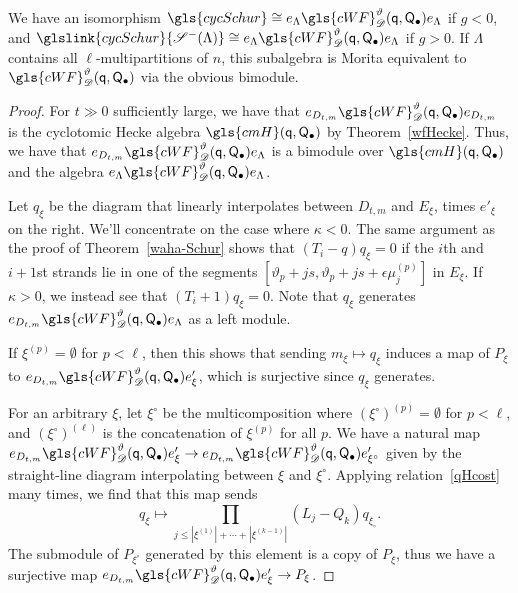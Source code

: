 \documentclass[ALCO,ThmDefs,Unicode,epreuves]{cedram}
\newcommand{\ck}{g}
\newcommand{\pq}{\mathsf{q}}
\newcommand{\PQ}{\mathsf{Q}}
\begin{document}
\begin{prop}\label{cqs-morita}
We have an isomorphism $\gls{cycSchur}\cong e_\Lambda \gls{cWF}^\vartheta_\mathscr{D}
 (\pq,\PQ_{\bullet})e_\Lambda $ if $\ck<0$, and $ \glslink{cycSchur}{\mathscr{S}^-(\Lambda)}\cong e_\Lambda \gls{cWF}^\vartheta_\mathscr{D}
 (\pq,\PQ_{\bullet})e_\Lambda $ if $\ck>0$. If $\Lambda$ contains all
 $\ell$-multipartitions of $n$, this subalgebra is Morita equivalent to $\gls{cWF}^\vartheta_\mathscr{D}
 (\pq,\PQ_{\bullet})$ via the obvious bimodule.
\end{prop}
\begin{proof}
 For $t\gg 0$ sufficiently large, we have that $e_{D_{t,m}}\gls{cWF}^\vartheta_\mathscr{D} (\pq,\PQ_{\bullet}) e_{D_{t,m}}$ is the cyclotomic
 Hecke algebra $\gls{cmH}(\pq,\PQ_\bullet) $ by Theorem~\ref{wfHecke}.
 Thus, we have that $e_{D_{t,m}}\gls{cWF}^\vartheta_\mathscr{D}
 (\pq,\PQ_{\bullet}) e_\Lambda $ is a bimodule over $\gls{cmH}(\pq,\PQ_\bullet)$
 and the algebra $e_\Lambda \gls{cWF}^\vartheta_\mathscr{D}
 (\pq,\PQ_{\bullet})e_\Lambda $. 


Let $q_\xi$ be the diagram that linearly
 interpolates between $D_{t,m}$ and $E_\xi$, times $e'_\xi$ on the
 right. We'll concentrate on the case where $\kappa<0$. The same argument as the proof of Theorem~\ref{waha-Schur}
 shows that $(T_i-q)q_\xi=0$ if the $i$th and $i+1$st strands lie in
 one of the segments $[
\vartheta_p+js,\vartheta_p+js+\epsilon\mu^{(p)}_j]$ in $E_\xi$. If
$\kappa>0$, we instead see that $(T_i+1)q_\xi=0$. Note
that $q_\xi$ generates $e_{D_{t,m}}\gls{cWF}^\vartheta_\mathscr{D}
 (\pq,\PQ_{\bullet}) e_\Lambda $ as a left module.

If $\xi^{(p)}=\emptyset$ for $p<\ell$, then this shows that sending
$m_\xi\mapsto q_\xi$ induces a map of $P_\xi$
to $e_{D_{t,m}}\gls{cWF}^\vartheta_\mathscr{D}
 (\pq,\PQ_{\bullet}) e'_\xi$, which is surjective since $q_{\xi}$
 generates. 

For an arbitrary $\xi$, let $\xi^\circ$ be the multicomposition where
$(\xi^\circ)^{(p)}=\emptyset$ for $p<\ell$, and $(\xi^\circ)^{(\ell)}$
is the concatenation of $\xi^{(p)}$ for all $p$. We have a natural
map $e_{D_{t,m}}\gls{cWF}^\vartheta_\mathscr{D}
 (\pq,\PQ_{\bullet}) e'_\xi\to e_{D_{t,m}}\gls{cWF}^\vartheta_\mathscr{D}
 (\pq,\PQ_{\bullet}) e'_{\xi^\circ}$ given by the straight-line
 diagram interpolating between $\xi$ and $\xi^\circ$. Applying
 relation~\eqref{qHcost} many times, we find that this map sends
 \[q_{\xi}\mapsto\prod_{j\leq|\xi^{(1)}|+\cdots +|\xi^{(k-1)}|}
 (L_j-Q_k)q_{\xi_\circ}.\] The submodule of $P_{\xi^\circ}$
 generated by this element is a copy of $P_{\xi}$, thus we have a
 surjective map $e_{D_{t,m}}\gls{cWF}^\vartheta_\mathscr{D}
 (\pq,\PQ_{\bullet}) e'_\xi\to P_{\xi}$. 



\end{proof}
\end{document}
